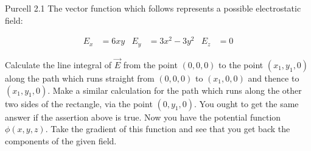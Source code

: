 \documentclass{esg8022pset}
\begin{document}
\begin{problem}{Purcell 2.1}
  The vector function which follows represents a possible electrostatic field:
  
  \begin{align*}
    E_x & = 6xy &
      E_y & = 3x^2 - 3y^2 &
        E_z & = 0
  \end{align*}

  Calculate the line integral of $\vec E$ from the point $(0, 0, 0)$ to the point $(x_1, y_1, 0)$ along the path which runs straight from $(0, 0, 0)$ to $(x_1, 0, 0)$ and thence to $(x_1, y_1, 0)$. Make a similar calculation for the path which runs along the other two sides of the rectangle, via the point $(0, y_1, 0)$. You ought to get the same answer if the assertion above is true. Now you have the potential function $\phi(x, y, z)$. Take the gradient of this function and see that you get back the components of the given field.
\end{problem}
\end{document}
